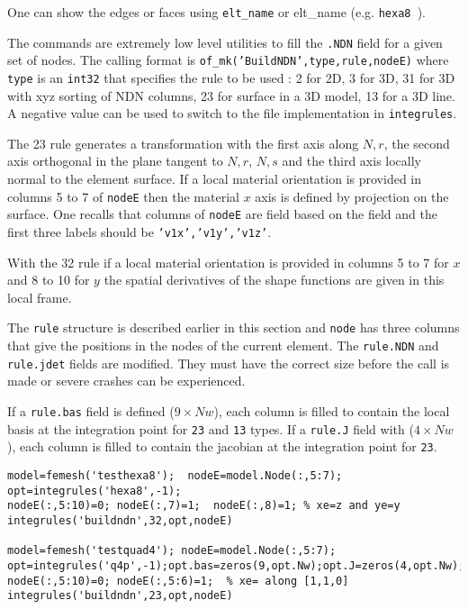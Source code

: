One can show the edges or faces using {\tt {\ti elt\_name}}  or {\ti elt\_name}  (e.g. {\tt hexa8 }).


The commands are extremely low level utilities to fill the {\tt .NDN} field for a given set of nodes. The calling format is {\tt of\_mk('BuildNDN',type,rule,nodeE)} where {\tt type} is an {\tt int32} that specifies the rule to be used : 2 for 2D, 3 for 3D, 31 for 3D with xyz sorting of NDN columns, 23 for surface in a 3D model, 13 for a 3D line. A negative value can be used to switch to the  file implementation in {\tt integrules}. 

The 23 rule generates a transformation with the first axis along $N,r$, the second axis orthogonal in the plane tangent to $N,r$, $N,s$ and the third axis locally normal to the element surface. If a local material orientation is provided in columns 5 to 7 of {\tt nodeE} then the material $x$ axis is defined by projection on the surface. One recalls that columns of {\tt nodeE} are field based on the  field and the first three labels should be {\tt 'v1x','v1y','v1z'}.

With the 32 rule if a local material orientation is provided in columns 5 to 7 for $x$ and 8 to 10 for $y$ the spatial derivatives of the shape functions are given in this local frame. 

The {\tt rule} structure is described earlier in this section and {\tt node} has three columns that give the positions in the nodes of the current element. The {\tt rule.NDN} and {\tt rule.jdet} fields are modified. They must have the correct size before the call is made or severe crashes can be experienced.

If a {\tt rule.bas} field is defined ($9\times Nw$), each column is filled to contain the local basis at the integration point for {\tt 23} and {\tt 13} types. If a {\tt rule.J} field with ($4\times Nw$), each column is filled to contain the jacobian at the integration point for {\tt 23}.

\begin{verbatim}
model=femesh('testhexa8');  nodeE=model.Node(:,5:7);
opt=integrules('hexa8',-1);
nodeE(:,5:10)=0; nodeE(:,7)=1;  nodeE(:,8)=1; % xe=z and ye=y
integrules('buildndn',32,opt,nodeE)

model=femesh('testquad4'); nodeE=model.Node(:,5:7);
opt=integrules('q4p',-1);opt.bas=zeros(9,opt.Nw);opt.J=zeros(4,opt.Nw);
nodeE(:,5:10)=0; nodeE(:,5:6)=1;  % xe= along [1,1,0]
integrules('buildndn',23,opt,nodeE)
\end{verbatim}%




